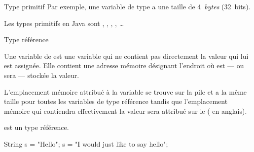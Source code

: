\begin{hideedit}
\begin{frame}{Type primitif}
  \pause
  Par exemple, une variable de type  a une taille de
  4~\textit{bytes} (32~bits).

  \begin{center}
  \end{center}

  Les types primitifs en Java sont , 
  , , , \dots
\end{frame}

\begin{frame}{Type référence}
  \begin{definition}
  Une variable de  est une variable qui ne contient
  pas directement la valeur qui lui est assignée. Elle contient une adresse
  mémoire désignant l'endroit où est --- ou sera --- stockée la valeur.

  L'emplacement mémoire attribué à la variable se trouve sur la pile et
  a la même taille pour toutes les variables de type référence tandis
  que l'emplacement mémoire qui contiendra effectivement la valeur sera
  attribué sur le  ( en anglais).
  \end{definition}

\end{frame}

\begin{frame}[fragile]
   est un type référence. 

  \begin{java}
String s = "Hello";
s = "I would just like to say hello";
  \end{java}

   {
  \hspace{3cm}
  }


\end{frame}
\end{hideedit}
